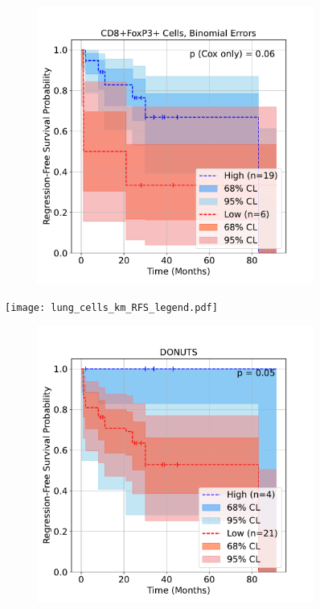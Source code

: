 \documentclass[article]{jss}
\begin{document}
\begin{figure}[ht]
\begin{subfigure}[c]{\figwidth}
    \caption{\label{fig:lung-dataset-cells-patient-wise}}
  \end{subfigure}
  \begin{subfigure}[c]{\figwidth}
    \centering
    \includegraphics[width=\linewidth]{lung_cells_km_RFS_binomial.pdf}
    \caption{\label{fig:lung-dataset-cells-binomial}}
  \end{subfigure}
  \begin{minipage}[c]{\legendwidth}
    \centering
    \movelegendup
    \texttt{[image: lung\_cells\_km\_RFS\_legend.pdf]}
  \end{minipage}
  \begin{subfigure}[c]{\figwidth}
    \centering
    \includegraphics[width=\linewidth]{lung_donuts_km_RFS.pdf}

\end{subfigure}
\end{figure}
\end{document}
